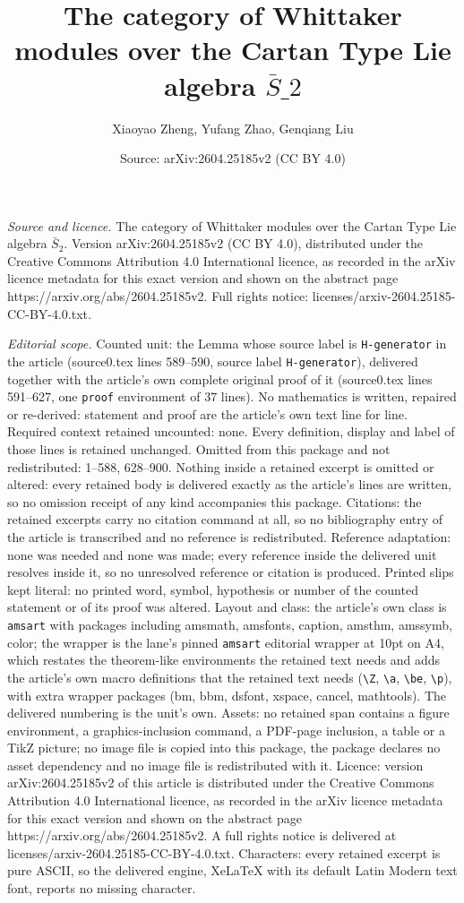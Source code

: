 \documentclass[10pt,a4paper]{amsart}
\title[The category of Whittaker modules over the Cartan Type Lie a]{The category of Whittaker modules over the Cartan Type Lie algebra $\bar{S}\_2$}
\author{Xiaoyao Zheng, Yufang Zhao, Genqiang Liu}
\date{Source: arXiv:2604.25185v2 (CC BY 4.0)}
\begin{document}
\maketitle

\noindent\emph{Source and licence.} The category of Whittaker modules over the Cartan Type Lie algebra $\bar{S}_2$. Version arXiv:2604.25185v2 (CC BY 4.0), distributed under the Creative Commons Attribution 4.0 International licence, as recorded in the arXiv licence metadata for this exact version and shown on the abstract page https://arxiv.org/abs/2604.25185v2. Full rights notice: licenses/arxiv-2604.25185-CC-BY-4.0.txt.\par\smallskip

\noindent\textit{Editorial scope.} Counted unit: the Lemma whose source label is \texttt{H-generator} in the article (source0.tex lines 589--590, source label \texttt{H-generator}), delivered together with the article's own complete original proof of it (source0.tex lines 591--627, one \texttt{proof} environment of 37 lines). No mathematics is written, repaired or re-derived: statement and proof are the article's own text line for line. Required context retained uncounted: none. Every definition, display and label of those lines is retained unchanged. Omitted from this package and not redistributed: 1--588, 628--900. Nothing inside a retained excerpt is omitted or altered: every retained body is delivered exactly as the article's lines are written, so no omission receipt of any kind accompanies this package. Citations: the retained excerpts carry no citation command at all, so no bibliography entry of the article is transcribed and no reference is redistributed. Reference adaptation: none was needed and none was made; every reference inside the delivered unit resolves inside it, so no unresolved reference or citation is produced. Printed slips kept literal: no printed word, symbol, hypothesis or number of the counted statement or of its proof was altered. Layout and class: the article's own class is \texttt{amsart} with packages including amsmath, amsfonts, caption, amsthm, amssymb, color; the wrapper is the lane's pinned \texttt{amsart} editorial wrapper at 10pt on A4, which restates the theorem-like environments the retained text needs and adds the article's own macro definitions that the retained text needs (\texttt{\textbackslash Z}, \texttt{\textbackslash a}, \texttt{\textbackslash be}, \texttt{\textbackslash p}), with extra wrapper packages (bm, bbm, dsfont, xspace, cancel, mathtools). The delivered numbering is the unit's own. Assets: no retained span contains a figure environment, a graphics-inclusion command, a PDF-page inclusion, a table or a TikZ picture; no image file is copied into this package, the package declares no asset dependency and no image file is redistributed with it. Licence: version arXiv:2604.25185v2 of this article is distributed under the Creative Commons Attribution 4.0 International licence, as recorded in the arXiv licence metadata for this exact version and shown on the abstract page https://arxiv.org/abs/2604.25185v2. A full rights notice is delivered at licenses/arxiv-2604.25185-CC-BY-4.0.txt. Characters: every retained excerpt is pure ASCII, so the delivered engine, XeLaTeX with its default Latin Modern text font, reports no missing character.
\end{document}

